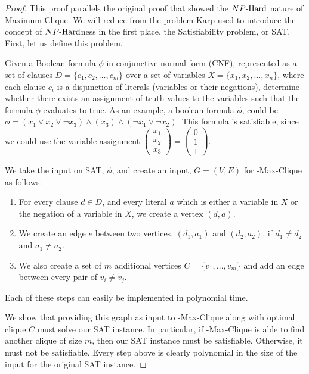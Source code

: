 \begin{proof}
    This proof parallels the original proof that showed the ${NP\text{-Hard{}}}$ nature of Maximum Clique. We will reduce from the problem Karp used to introduce the concept of ${NP\text{-Hard{}}}$ness in the first place, the Satisfiability problem, or SAT. First, let us define this problem. 
    \begin{definition}
Given a Boolean formula $\phi$ in conjunctive normal form (CNF), represented as a set of clauses $D = \{c_1, c_2, \ldots, c_m\}$ over a set of variables $X = \{x_1, x_2, \ldots, x_n\}$, where each clause $c_i$ is a disjunction of literals (variables or their negations), determine whether there exists an assignment of truth values to the variables such that the formula $\phi$ evaluates to true. As an example, a boolean formula $\phi$, could be $\phi = (x_1 \vee x_2 \vee \neg x_3) \wedge (x_3) \wedge (\neg x_1 \vee \neg x_2)$. This formula is satisfiable, since we could use the variable assignment
$\begin{pmatrix}
    x_1 \\
    x_2 \\
    x_3
\end{pmatrix} =
\begin{pmatrix}
    0 \\
    1 \\
    1
\end{pmatrix}.$
\end{definition}
We take the input on SAT, $\phi$, and create an input, $G = (V, E)$ for \inob{}-Max-Clique as follows:
\begin{enumerate}
    \item For every clause $d \in D$, and every literal $a$ which is either a variable in $X$ or the negation of a variable in $X$, we create a vertex $(d, a)$.
    \item We create an edge $e$ between two vertices, $(d_1, a_1)$ and $(d_2, a_2)$, if $d_1 \neq d_2$ and $a_1 \neq a_2$.
    \item We also create a set of $m$ additional vertices $C =\{v_1, ..., v_m\}$ and add an edge between every pair of $v_i \neq v_j$.
\end{enumerate}
Each of these steps can easily be implemented in polynomial time.

We show that providing this graph as input to \inob{}-Max-Clique along with optimal clique $C$ must solve our SAT instance. In particular, if \inob{}-Max-Clique is able to find another clique of size $m$, then our SAT instance must be satisfiable. Otherwise, it must not be satisfiable. Every step above is clearly polynomial in the size of the input for the original SAT instance.


\end{proof}
